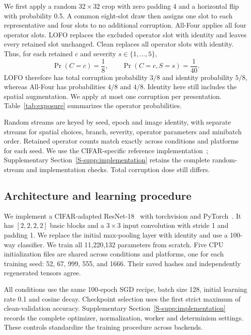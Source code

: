 \documentclass[twoside,a4paper,11pt]{article}
\begin{document}
We first apply a random $32\times32$ crop with zero padding 4 and a horizontal flip with probability 0.5. A common eight-slot draw then assigns one slot to each representative and four slots to no additional corruption. All-Four applies all four operator slots. LOFO replaces the excluded operator slot with identity and leaves every retained slot unchanged. Clean replaces all operator slots with identity. Thus, for each retained $c$ and severity $s\in\{1,\ldots,5\}$,
\begin{equation}
\Pr(C=c)=\frac18,\qquad \Pr(C=c,S=s)=\frac1{40}.
\label{eq:exposure}
\end{equation}
LOFO therefore has total corruption probability $3/8$ and identity probability $5/8$, whereas All-Four has probabilities $4/8$ and $4/8$. Identity here still includes the spatial augmentation. We apply at most one corruption per presentation. Table~\ref{tab:exposure} summarizes the operator probabilities.



Random streams are keyed by seed, epoch and image identity, with separate streams for spatial choices, branch, severity, operator parameters and minibatch order. Retained operator counts match exactly across conditions and platforms for each seed. We use the CIFAR-specific reference implementation~\cite{cifarreference}; Supplementary Section~\ref{S-supp:implementation} retains the complete random-stream and implementation checks. Total corruption dose still differs.

\subsection{Architecture and learning procedure}
\label{sec:training}
We implement a CIFAR-adapted ResNet-18~\cite{he2016resnet} with torchvision and PyTorch~\cite{paszke2019pytorch}. It has $[2,2,2,2]$ basic blocks and a $3\times3$ input convolution with stride 1 and padding 1. We replace the initial max-pooling layer with identity and use a 100-way classifier. We train all 11,220,132 parameters from scratch. Five CPU initialization files are shared across conditions and platforms, one for each training seed: 52, 67, 999, 555, and 1666. Their saved hashes and independently regenerated tensors agree.

All conditions use the same 100-epoch SGD recipe, batch size 128, initial learning rate 0.1 and cosine decay. Checkpoint selection uses the first strict maximum of clean-validation accuracy. Supplementary Section~\ref{S-supp:implementation} records the complete optimizer, normalization, worker and determinism settings. These controls standardize the training procedure across backends.
\end{document}
